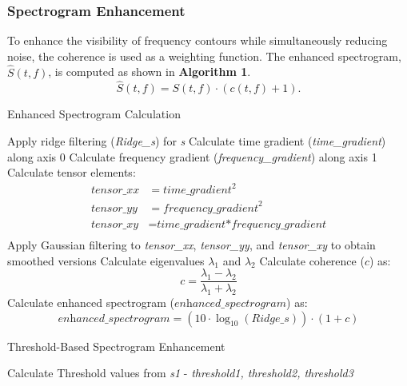 \documentclass[applsci,article,accept,moreauthors,pdftex]{Definitions/mdpi}
\begin{document}
\subsubsection{Spectrogram Enhancement}\label{subsub-SE}
To enhance the visibility of frequency contours while simultaneously reducing noise, the coherence is used as a weighting function. The enhanced spectrogram, $\hat{S}(t, f)$, is computed as shown in {\bf Algorithm 1}.
\begin{equation}
	\hat{S}(t, f) = S(t, f) \cdot (c(t, f) + 1).
\end{equation}

\begin{algorithm}[tb]
	\caption{Enhanced Spectrogram Calculation}
	Apply ridge filtering (\textit{Ridge\_s}) for \textit{s}\;
	Calculate time gradient (\textit{time\_gradient}) along axis 0\;
	Calculate frequency gradient (\textit{frequency\_gradient}) along axis 1\;
	Calculate tensor elements:
	\begin{align*}
		\textit{tensor\_xx} &= \textit{time\_gradient}^2 \\
		\textit{tensor\_yy} &= \textit{frequency\_gradient}^2 \\
		\textit{tensor\_xy} &= \textit{time\_gradient*frequency\_gradient} \\
	\end{align*}
	Apply Gaussian filtering to \textit{tensor\_xx}, \textit{tensor\_yy}, and \textit{tensor\_xy} to obtain smoothed versions\;
	Calculate eigenvalues $\lambda_1$ and $\lambda_2$ \; 
	Calculate coherence ($\textit{c}$) as:
	\[\textit{c} = \frac{\lambda_1 - \lambda_2}{\lambda_1 + \lambda_2}\]
	Calculate enhanced spectrogram ($\textit{enhanced\_spectrogram}$) as:
	\[\textit{enhanced\_spectrogram} = (10 \cdot \log_{10}(\textit{Ridge\_s})) \cdot (1 + \textit{c})\]
	\;
\end{algorithm}

\begin{algorithm}[tb]
	\caption{Threshold-Based Spectrogram Enhancement}
	
	Calculate Threshold values from \textit{s1} - \textit{threshold1, threshold2, threshold3} \;
	\;
\end{algorithm}
\end{document}
